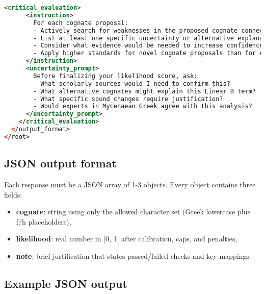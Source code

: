 \begin{lstlisting}[style=mystyle, language=XML, breaklines=true]
    <critical_evaluation>
      <instruction>
        For each cognate proposal:
        - Actively search for weaknesses in the proposed cognate connection
        - List at least one specific uncertainty or alternative explanation
        - Consider what evidence would be needed to increase confidence
        - Apply higher standards for novel cognate proposals than for established ones
      </instruction>
      <uncertainty_prompt>
        Before finalizing your likelihood score, ask:
        - What scholarly sources would I need to confirm this?
        - What alternative cognates might explain this Linear B term?
        - What specific sound changes require justification?
        - Would experts in Mycenaean Greek agree with this analysis?
      </uncertainty_prompt>
    </critical_evaluation>
  </output_format>
</root>
\end{lstlisting}

\subsection{JSON output format}

Each response must be a JSON array of 1-3 objects.
Every object contains three fields:
\begin{itemize}[leftmargin=2em]
  \item \textbf{cognate}: string using only the allowed character set (Greek lowercase plus f/h placeholders),
  \item \textbf{likelihood}: real number in [0, 1] after calibration, caps, and penalties,
  \item \textbf{note}: brief justification that states passed/failed checks and key mappings.
\end{itemize}

\subsection{Example JSON output}

